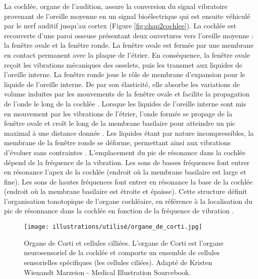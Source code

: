 La cochlée, organe de l'audition, assure la conversion du signal vibratoire provenant de l'oreille moyenne en un signal bioélectrique qui est ensuite véhiculé par le nerf auditif jusqu'au cortex (Figure \ref{fig:chap2cochlee}). 
La cochlée est recouverte d'une paroi osseuse présentant deux ouvertures vers l'oreille moyenne : la fenêtre ovale et la fenêtre ronde. 
La fenêtre ovale est fermée par une membrane en contact permanent avec la plaque de l'étrier. 
En conséquence, la fenêtre ovale reçoit les vibrations mécaniques des osselets, puis les transmet aux liquides de l'oreille interne. 
La fenêtre ronde joue le rôle de membrane d'expansion pour le liquide de l'oreille interne. 
De par son élasticité, elle absorbe les variations de volume induites par les mouvements de la fenêtre ovale et facilite la propagation de l’onde le long de la cochlée \citep{lorenzi2016audition}. 
Lorsque les liquides de l'oreille interne sont mis en mouvement par les vibrations de l'étrier, l'onde formée se propage de la fenêtre ovale et croît le long de la membrane basilaire pour atteindre un pic maximal à une distance donnée \citep{isnard2016efficacite}. 
Les liquides étant par nature incompressibles, la membrane de la fenêtre ronde se déforme, permettant ainsi aux vibrations d’évoluer sans contraintes \citep{hasselmann2017codage}. 
L’emplacement du pic de résonance dans la cochlée dépend de la fréquence de la vibration. 
Les sons de basses fréquences font entrer en résonance l'apex de la cochlée (endroit où la membrane basilaire est large et fine). 
Les sons de hautes fréquences font entrer en résonance la base de la cochlée (endroit où la membrane basilaire est étroite et épaisse). 
Cette structure définit l'organisation tonotopique de l'organe cochléaire, en référence à la localisation du pic de résonnance dans la cochlée en fonction de la fréquence de vibration \citep{moore2012introduction}. 

\begin{figure*}[!t]
\center
\texttt{[image: illustrations/utilisé/organe\_de\_corti.jpg]}
\caption[Cellules cilliées de l'organe cochléaire]{Organe de Corti et cellules cilliées. L’organe de Corti est l’organe neurosensoriel de la cochlée et comporte un ensemble de cellules sensorielles spécifiques (les cellules ciliées). Adapté de Kristen Wienandt Marzeion - Medical Illustration Sourcebook.}
\label{fig:chap2organedecorti}
\end{figure*}

